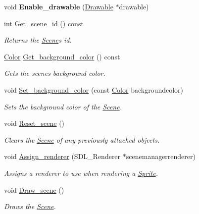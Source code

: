 \begin{DoxyCompactItemize}
\mbox{\label{classjetfuel_1_1draw_1_1Scene_ab84abd926680576fe264a23d732307e8}} 
void {\bfseries Enable\+\_\+drawable} (\hyperlink{classjetfuel_1_1draw_1_1Drawable}{Drawable} $\ast$drawable)
\item 
int \hyperlink{classjetfuel_1_1draw_1_1Scene_a03433414bcb71d2001ecc717800b628b}{Get\+\_\+scene\+\_\+id} () const
\begin{DoxyCompactList}\small\item\em Returns the \hyperlink{classjetfuel_1_1draw_1_1Scene}{Scene}\textquotesingle{}s id. \end{DoxyCompactList}\item 
\hyperlink{classjetfuel_1_1draw_1_1Color}{Color} \hyperlink{classjetfuel_1_1draw_1_1Scene_a212ff5b6cb07e2332b92ef72f5d67819}{Get\+\_\+background\+\_\+color} () const
\begin{DoxyCompactList}\small\item\em Gets the scene\textquotesingle{}s background color. \end{DoxyCompactList}\item 
void \hyperlink{classjetfuel_1_1draw_1_1Scene_aa3d099d358cd8ad9274d633805f3cc43}{Set\+\_\+background\+\_\+color} (const \hyperlink{classjetfuel_1_1draw_1_1Color}{Color} backgroundcolor)
\begin{DoxyCompactList}\small\item\em Sets the background color of the \hyperlink{classjetfuel_1_1draw_1_1Scene}{Scene}. \end{DoxyCompactList}\item 
void \hyperlink{classjetfuel_1_1draw_1_1Scene_a6ee0359540800521294fda5d1d8b86b1}{Reset\+\_\+scene} ()
\begin{DoxyCompactList}\small\item\em Clears the \hyperlink{classjetfuel_1_1draw_1_1Scene}{Scene} of any previously attached objects. \end{DoxyCompactList}\item 
void \hyperlink{classjetfuel_1_1draw_1_1Scene_a0cd111e8863ab2e9e78cd3b6144c64a8}{Assign\+\_\+renderer} (S\+D\+L\+\_\+\+Renderer $\ast$scenemanagerrenderer)
\begin{DoxyCompactList}\small\item\em Assigns a renderer to use when rendering a \hyperlink{classjetfuel_1_1draw_1_1Sprite}{Sprite}. \end{DoxyCompactList}\item 
void \hyperlink{classjetfuel_1_1draw_1_1Scene_a80b9b5f38022b6c2af9921656f93056b}{Draw\+\_\+scene} ()
\begin{DoxyCompactList}\small\item\em Draws the \hyperlink{classjetfuel_1_1draw_1_1Scene}{Scene}. \end{DoxyCompactList}\end{DoxyCompactItemize}
